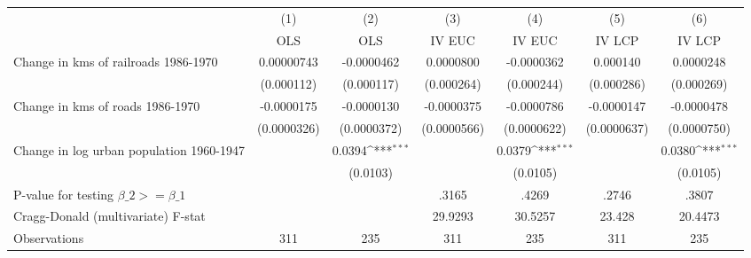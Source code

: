 {
\def\sym#1{\ifmmode^{#1}\else\(^{#1}\)\fi}
\begin{tabular}{l*{6}{c}}
\hline\hline
                &\multicolumn{1}{c}{(1)}&\multicolumn{1}{c}{(2)}&\multicolumn{1}{c}{(3)}&\multicolumn{1}{c}{(4)}&\multicolumn{1}{c}{(5)}&\multicolumn{1}{c}{(6)}\\
                &\multicolumn{1}{c}{OLS}&\multicolumn{1}{c}{OLS}&\multicolumn{1}{c}{IV EUC}&\multicolumn{1}{c}{IV EUC}&\multicolumn{1}{c}{IV LCP}&\multicolumn{1}{c}{IV LCP}\\
\hline
Change in kms of railroads 1986-1970&0.00000743         &-0.0000462         &0.0000800         &-0.0000362         & 0.000140         &0.0000248         \\
                &(0.000112)         &(0.000117)         &(0.000264)         &(0.000244)         &(0.000286)         &(0.000269)         \\
[1em]
Change in kms of roads 1986-1970&-0.0000175         &-0.0000130         &-0.0000375         &-0.0000786         &-0.0000147         &-0.0000478         \\
                &(0.0000326)         &(0.0000372)         &(0.0000566)         &(0.0000622)         &(0.0000637)         &(0.0000750)         \\
[1em]
Change in log urban population 1960-1947&                  &   0.0394\sym{***}&                  &   0.0379\sym{***}&                  &   0.0380\sym{***}\\
                &                  & (0.0103)         &                  & (0.0105)         &                  & (0.0105)         \\
\hline
P-value for testing $\beta\_{2} >= \beta\_{1}$&                  &                  &    .3165         &    .4269         &    .2746         &    .3807         \\
Cragg-Donald (multivariate) F-stat&                  &                  &  29.9293         &  30.5257         &   23.428         &  20.4473         \\
Observations    &      311         &      235         &      311         &      235         &      311         &      235         \\
\hline\hline
\end{tabular}
}
